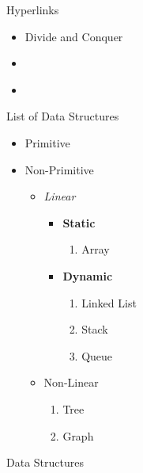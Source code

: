 \documentclass{beamer}[10pt]
\begin{document}
\begin{frame}{Hyperlinks}
\begin{itemize}
    \item Divide and Conquer
    \item \hyperlink{Algorithms}{}
    \item \hyperlink{Algorithms}{}
\end{itemize}
    
\end{frame}
\begin{frame}{List of Data Structures}
\begin{itemize}
    \item Primitive \pause
    \item Non-Primitive
    
    \begin{itemize}
        \item \textit{Linear} \pause
        \begin{itemize}
            \item<2-> \textbf{Static}
            \begin{enumerate}
                \item<4->{ Array}
            \end{enumerate}
            \item<2-> \textbf{Dynamic}
            \begin{enumerate}
                \item<4-> Linked List
                \item<4-> Stack
                \item<4-> Queue
            \end{enumerate}
        \end{itemize}
        \item<5-> Non-Linear
        \begin{enumerate}
            \item<5-> Tree
            \item<5-> Graph
        \end{enumerate}
    \end{itemize}
\end{itemize}
    
\end{frame}
\begin{frame}{Data Structures}

    
\end{frame}
\end{document}
